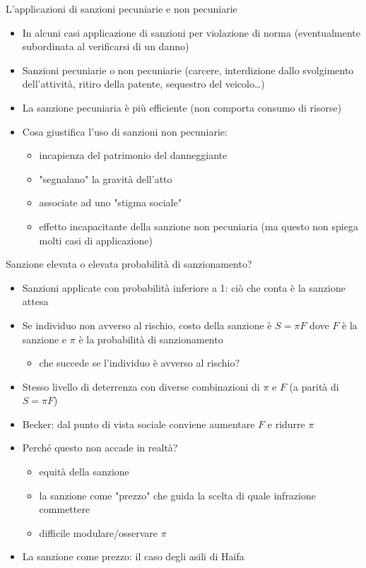 \documentclass[aspectratio=64,11pt]{beamer}
\begin{document}
\begin{frame}{L'applicazioni di sanzioni pecuniarie e non pecuniarie}
\begin{itemize}
\item In alcuni casi applicazione di sanzioni per violazione di norma
(eventualmente subordinata al verificarsi di un danno)
\item Sanzioni \alert{pecuniarie} o \alert{non pecuniarie} (carcere, interdizione dallo
svolgimento dell'attività, ritiro della patente, sequestro del veicolo\ldots{})
\item La sanzione pecuniaria è più \alert{efficiente} (non comporta consumo di risorse)
\item Cosa giustifica l'uso di sanzioni non pecuniarie:
\begin{itemize}
\item incapienza del patrimonio del danneggiante
\item "segnalano" la gravità dell'atto
\item associate ad uno "stigma sociale"
\item effetto incapacitante della sanzione non pecuniaria (ma questo non spiega
molti casi di applicazione)
\end{itemize}
\end{itemize}
\end{frame}

\begin{frame}{Sanzione elevata o elevata probabilità di sanzionamento?}
\begin{itemize}
\item Sanzioni applicate con probabilità inferiore a 1: ciò che conta è la
\alert{sanzione attesa}
\item Se individuo non avverso al rischio, costo della sanzione è $S=\pi F$ dove
$F$ è la sanzione e $\pi$ è la probabilità di sanzionamento
\begin{itemize}
\item che succede se l'individuo è avverso al rischio?
\end{itemize}
\item Stesso livello di deterrenza con diverse combinazioni di $\pi$ e $F$ (a
parità di $S=\pi F$)
\item Becker: dal punto di vista sociale conviene aumentare $F$ e ridurre $\pi$
\item Perché questo non accade in realtà?
\begin{itemize}
\item equità della sanzione
\item la sanzione come "prezzo" che guida la scelta di quale infrazione
commettere
\item difficile modulare/osservare $\pi$
\end{itemize}
\item La sanzione come \alert{prezzo}: il caso degli asili di Haifa
\end{itemize}
\end{frame}
\end{document}
